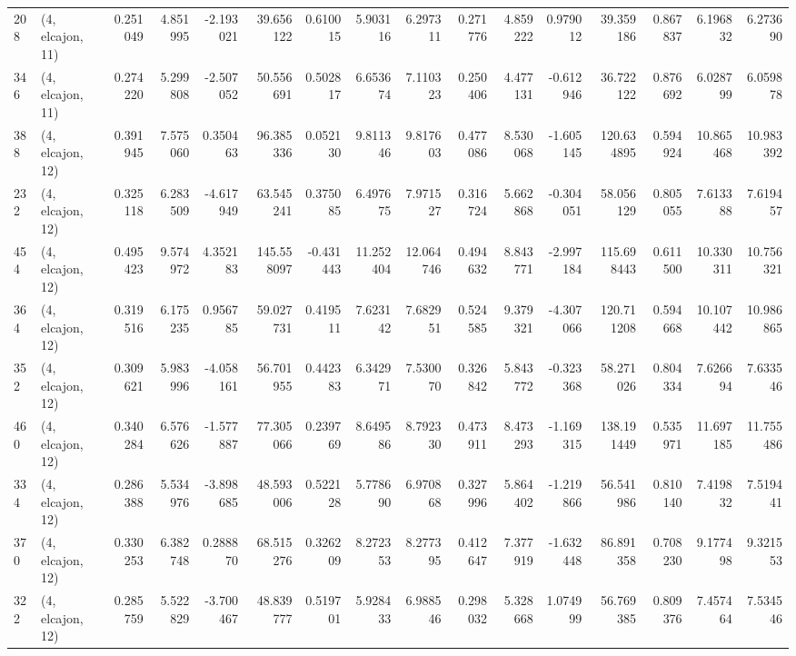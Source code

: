 \begin{tabular}{llrrrrrrrrrrrrrr}
208 &  (4, elcajon, 11) &   0.251049 &   4.851995 &  -2.193021 &    39.656122 &   0.610015 &   5.903116 &   6.297311 &  0.271776 &   4.859222 &   0.979012 &    39.359186 &  0.867837 &   6.196832 &   6.273690 \\
346 &  (4, elcajon, 11) &   0.274220 &   5.299808 &  -2.507052 &    50.556691 &   0.502817 &   6.653674 &   7.110323 &  0.250406 &   4.477131 &  -0.612946 &    36.722122 &  0.876692 &   6.028799 &   6.059878 \\
388 &  (4, elcajon, 12) &   0.391945 &   7.575060 &   0.350463 &    96.385336 &   0.052130 &   9.811346 &   9.817603 &  0.477086 &   8.530068 &  -1.605145 &   120.634895 &  0.594924 &  10.865468 &  10.983392 \\
232 &  (4, elcajon, 12) &   0.325118 &   6.283509 &  -4.617949 &    63.545241 &   0.375085 &   6.497675 &   7.971527 &  0.316724 &   5.662868 &  -0.304051 &    58.056129 &  0.805055 &   7.613388 &   7.619457 \\
454 &  (4, elcajon, 12) &   0.495423 &   9.574972 &   4.352183 &   145.558097 &  -0.431443 &  11.252404 &  12.064746 &  0.494632 &   8.843771 &  -2.997184 &   115.698443 &  0.611500 &  10.330311 &  10.756321 \\
364 &  (4, elcajon, 12) &   0.319516 &   6.175235 &   0.956785 &    59.027731 &   0.419511 &   7.623142 &   7.682951 &  0.524585 &   9.379321 &  -4.307066 &   120.711208 &  0.594668 &  10.107442 &  10.986865 \\
352 &  (4, elcajon, 12) &   0.309621 &   5.983996 &  -4.058161 &    56.701955 &   0.442383 &   6.342971 &   7.530070 &  0.326842 &   5.843772 &  -0.323368 &    58.271026 &  0.804334 &   7.626694 &   7.633546 \\
460 &  (4, elcajon, 12) &   0.340284 &   6.576626 &  -1.577887 &    77.305066 &   0.239769 &   8.649586 &   8.792330 &  0.473911 &   8.473293 &  -1.169315 &   138.191449 &  0.535971 &  11.697185 &  11.755486 \\
334 &  (4, elcajon, 12) &   0.286388 &   5.534976 &  -3.898685 &    48.593006 &   0.522128 &   5.778690 &   6.970868 &  0.327996 &   5.864402 &  -1.219866 &    56.541986 &  0.810140 &   7.419832 &   7.519441 \\
370 &  (4, elcajon, 12) &   0.330253 &   6.382748 &   0.288870 &    68.515276 &   0.326209 &   8.272353 &   8.277395 &  0.412647 &   7.377919 &  -1.632448 &    86.891358 &  0.708230 &   9.177498 &   9.321553 \\
322 &  (4, elcajon, 12) &   0.285759 &   5.522829 &  -3.700467 &    48.839777 &   0.519701 &   5.928433 &   6.988546 &  0.298032 &   5.328668 &   1.074999 &    56.769385 &  0.809376 &   7.457464 &   7.534546 \\

\end{tabular}
